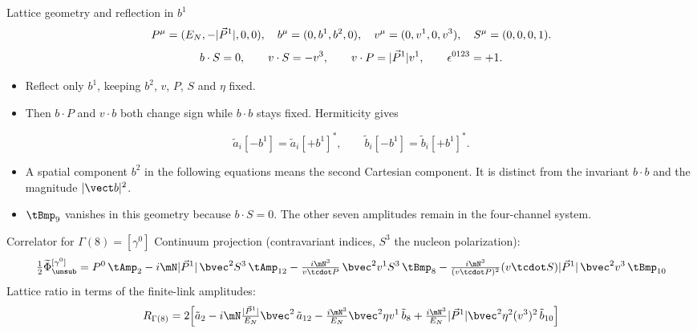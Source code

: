 \begin{frame}{Lattice geometry and reflection in $b^1$}
  \[
  P^\mu=(E_N,-|\vec P^{1}|,0,0),\quad b^\mu=(0,b^1,b^2,0),
  \quad v^\mu=(0,v^1,0,v^3),\quad S^\mu=(0,0,0,1).
  \]
  \[
  b\cdot S=0,\qquad v\cdot S=-v^3,\qquad v\cdot P=|\vec P^{1}| v^1,
  \qquad \epsilon^{0123}=+1.
  \]
  \begin{itemize}
    \item Reflect only $b^1$, keeping $b^2$, $v$, $P$, $S$ and $\eta$ fixed.
    \item Then $b\cdot P$ and $v\cdot b$ both change sign while $b\cdot b$ stays fixed. Hermiticity gives
  \end{itemize}
  \[
  \tilde a_i[-b^1]=\tilde a_i[+b^1]^*,\qquad
  \tilde b_i[-b^1]=\tilde b_i[+b^1]^*.
  \]
  \begin{itemize}
    \item A spatial component $b^2$ in the following equations means the second Cartesian component. It is distinct from the invariant $b\cdot b$ and the magnitude $|\vect b|^2$.
    \item $\tBmp_9$ vanishes in this geometry because $b\cdot S=0$. The other seven amplitudes remain in the four-channel system.
  \end{itemize}
\end{frame}

\begin{frame}{Correlator for $\Gamma(8)=[\gamma^0]$}
  \small
  Continuum projection (contravariant indices, $S^3$ the nucleon polarization):
  \[ \tfrac12\widetilde\Phi^{[\gamma^0]}_{\unsub}=P^0\,\tAmp_2-i\mN\Pa\,\bvec^2S^3\,\tAmp_{12}-\tfrac{i\mN^3}{v\tcdot P}\,\bvec^2v^1S^3\,\tBmp_8-\tfrac{i\mN^3}{(v\tcdot P)^2}(v\tcdot S)\Pa\,\bvec^2v^3\,\tBmp_{10} \]
  Lattice ratio in terms of the finite-link amplitudes:
  \[ R_{\Gamma(8)}=2\Big[\tilde a_2-i\mN\tfrac{\Pa}{\En}\bvec^2\,\tilde a_{12}-\tfrac{i\mN^3}{\En}\bvec^2\eta v^1\,\tilde b_8+\tfrac{i\mN^3}{\En}\Pa\bvec^2\eta^2(v^3)^2\,\tilde b_{10}\Big] \]
\end{frame}

